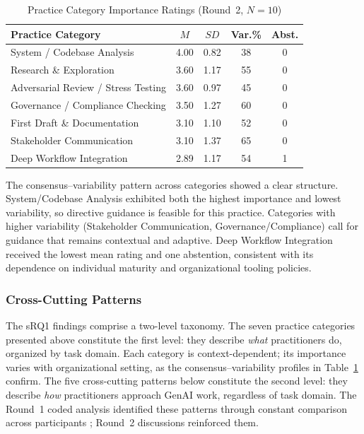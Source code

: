 \begin{table}[!ht]
    \centering
    \caption{Practice Category Importance Ratings (Round~2, $N = 10$)}\label{tab:practice-importance}
    \begin{tabular}{|p{6.5cm}|c|c|c|c|}
        \hline
        \textbf{Practice Category} & \textbf{$M$} & \textbf{$SD$} & \textbf{Var.\%} & \textbf{Abst.} \\
        \hline
        System / Codebase Analysis & 4.00 & 0.82 & 38 & 0 \\
        \hline
        Research \& Exploration & 3.60 & 1.17 & 55 & 0 \\
        \hline
        Adversarial Review / Stress Testing & 3.60 & 0.97 & 45 & 0 \\
        \hline
        Governance / Compliance Checking & 3.50 & 1.27 & 60 & 0 \\
        \hline
        First Draft \& Documentation & 3.10 & 1.10 & 52 & 0 \\
        \hline
        Stakeholder Communication & 3.10 & 1.37 & 65 & 0 \\
        \hline
        Deep Workflow Integration & 2.89 & 1.17 & 54 & 1 \\
        \hline
    \end{tabular}
\end{table}

The consensus--variability pattern across categories showed a clear structure.
System/Codebase Analysis exhibited both the highest importance and lowest
variability, so directive guidance is feasible for this practice. Categories with higher
variability (Stakeholder Communication, Governance/Compliance) call for
guidance that remains contextual and adaptive. Deep Workflow Integration received
the lowest mean rating and one abstention, consistent with its dependence on
individual maturity and organizational tooling policies.

\subsubsection{Cross-Cutting Patterns}\label{subsubsec:cross-cutting}

The sRQ1 findings comprise a two-level taxonomy. The seven practice categories
presented above constitute the first level: they describe \emph{what}
practitioners do, organized by task domain. Each category is
context-dependent; its importance varies with organizational setting, as the
consensus--variability profiles in Table~\ref{tab:practice-importance} confirm.
The five cross-cutting patterns below constitute the second level: they
describe \emph{how} practitioners approach GenAI work, regardless of task
domain. The Round~1 coded analysis identified these patterns through constant
comparison across participants \parencite{charmaz_constructing_2014}; Round~2
discussions reinforced them.

